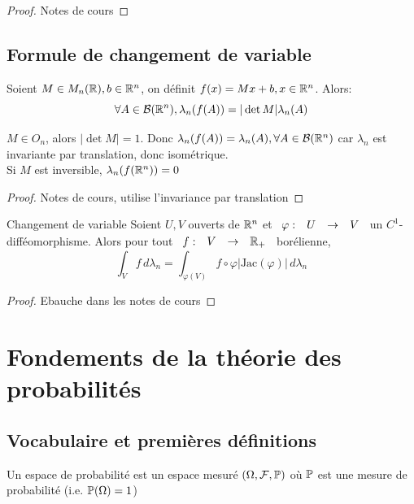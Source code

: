 \documentclass[]{report}
\begin{document}
    \begin{proof}
        Notes de cours
    \end{proof}

    \section{Formule de changement de variable}

    \begin{prop}{}{}
        Soient $M\in M_n(\mathbb{R}),b\in \mathbb{R}^n$, on définit $f(x)=Mx+b, x\in \mathbb{R}^n$. Alors:
        \[ \forall A\in \mathcal{B}(\mathbb{R}^n),\lambda_n(f(A))=|\det M|\lambda_n(A)\]
    \end{prop}

    \begin{re}{}{}
        $M\in O_n$, alors $|\det M|=1$. Donc $\lambda_n(f(A))=\lambda_n(A),\forall A\in\mathcal{B}(\mathbb{R}^n)$ car $\lambda_n$ est invariante par translation, donc isométrique.\\
        Si $M$ est inversible, $\lambda_n(f(\mathbb{R}^n))=0$
    \end{re}

    \begin{proof}
        Notes de cours, utilise l'invariance par translation
    \end{proof}

    \begin{tm}{Changement de variable}{}
        Soient $U,V$ ouverts de $\mathbb{R}^n$ et $\begin{array}{ccccc} \varphi : & U & \to & V \end{array}$ un $C^1$-difféomorphisme. Alors pour tout $\begin{array}{ccccc} f : & V & \to & \mathbb{R}_+ \end{array}$ borélienne,
        \[\int_V f\,d\lambda_n=\int_{\varphi(V)} f\circ \varphi |\text{Jac}(\varphi)|\,d\lambda_n\]
    \end{tm}

    \begin{proof}
        Ebauche dans les notes de cours
    \end{proof}

    \chapter{Fondements de la théorie des probabilités}

    \section{Vocabulaire et premières définitions}

    \begin{df}{}{}
        Un espace de probabilité est un espace mesuré $(\Omega,\mathcal{F},\mathbb{P})$ où $\mathbb{P}$ est une mesure de probabilité (i.e. $\mathbb{P}(\Omega)=1$)
    \end{df}
\end{document}
